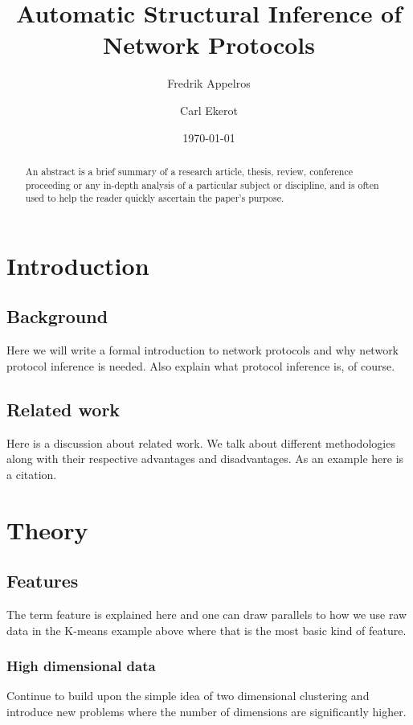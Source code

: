 \documentclass[a4paper]{report}
\begin{document}
\title{Automatic Structural Inference of Network Protocols}
\author{Fredrik Appelros \and Carl Ekerot}
\date{\today}
\maketitle

\begin{abstract}
An abstract is a brief summary of a research article, thesis, review,
conference proceeding or any in-depth analysis of a particular subject or
discipline, and is often used to help the reader quickly ascertain the paper's
purpose.
\end{abstract}

\tableofcontents

\chapter{Introduction}

\section{Background}
Here we will write a formal introduction to network protocols and why network
protocol inference is needed. Also explain what protocol inference is, of
course.

\section{Related work}
Here is a discussion about related work. We talk about different methodologies
along with their respective advantages and disadvantages. As an example here
is a citation\cite{cui07}.

\chapter{Theory}

\section{Features}
The term feature is explained here and one can draw parallels to how we use
raw data in the K-means example above where that is the most basic kind of
feature.

\subsection{High dimensional data}
Continue to build upon the simple idea of two dimensional clustering and
introduce new problems where the number of dimensions are significantly
higher.
\end{document}
